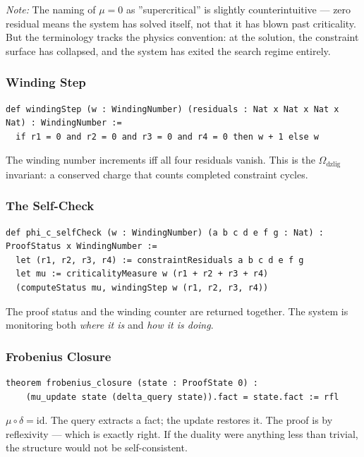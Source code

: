 \documentclass[12pt,a4paper]{article}
\begin{document}
\emph{Note:} The naming of $\mu = 0$ as ''supercritical'' is slightly counterintuitive --- zero residual means the system has solved itself, not that it has blown past criticality. But the terminology tracks the physics convention: at the solution, the constraint surface has collapsed, and the system has exited the search regime entirely.

\subsubsection{Winding Step}

\begin{lstlisting}[language=lean]
def windingStep (w : WindingNumber) (residuals : Nat x Nat x Nat x Nat) : WindingNumber :=
  if r1 = 0 and r2 = 0 and r3 = 0 and r4 = 0 then w + 1 else w
\end{lstlisting}

The winding number increments iff all four residuals vanish. This is the $\Omega_{\text{dzlig}}$ invariant: a conserved charge that counts completed constraint cycles.

\subsubsection{The Self-Check}

\begin{lstlisting}[language=lean]
def phi_c_selfCheck (w : WindingNumber) (a b c d e f g : Nat) : ProofStatus x WindingNumber :=
  let (r1, r2, r3, r4) := constraintResiduals a b c d e f g
  let mu := criticalityMeasure w (r1 + r2 + r3 + r4)
  (computeStatus mu, windingStep w (r1, r2, r3, r4))
\end{lstlisting}

The proof status and the winding counter are returned together. The system is monitoring both \emph{where it is} and \emph{how it is doing}.

\subsubsection{Frobenius Closure}

\begin{lstlisting}[language=lean]
theorem frobenius_closure (state : ProofState 0) :
    (mu_update state (delta_query state)).fact = state.fact := rfl
\end{lstlisting}

$\mu \circ \delta = \text{id}$. The query extracts a fact; the update restores it. The proof is by reflexivity --- which is exactly right. If the duality were anything less than trivial, the structure would not be self-consistent.
\end{document}
